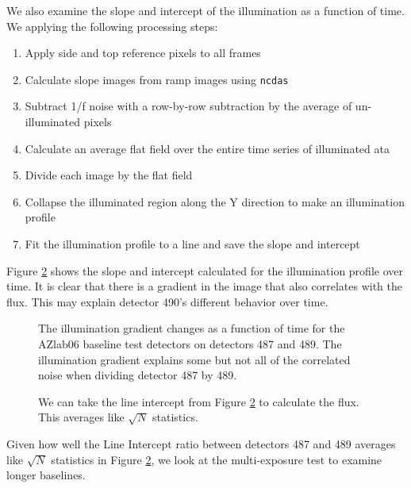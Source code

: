 \documentclass{aastex62}
\begin{document}
We also examine the slope and intercept of the illumination as a function of time.
We applying the following processing steps:
\begin{enumerate}
	\item Apply side and top reference pixels to all frames
	\item	Calculate slope images from ramp images using \texttt{ncdas}
	\item Subtract 1/f noise with a row-by-row subtraction by the average of un-illuminated pixels
	\item Calculate an average flat field over the entire time series of illuminated ata
	\item Divide each image by the flat field
	\item Collapse the illuminated region along the Y direction to make an illumination profile
	\item Fit the illumination profile to a line and save the slope and intercept
\end{enumerate}
Figure \ref{fig:illumGradientChangeOverTime} shows the slope and intercept calculated for the illumination profile over time.
It is clear that there is a gradient in the image that also correlates with the flux.
This may explain detector 490's different behavior over time.

\begin{figure}
\caption{The illumination gradient changes as a function of time for the AZlab06 baseline test detectors on detectors 487 and 489.
The illumination gradient explains some but not all of the correlated noise when dividing detector 487 by 489.}\label{fig:illumGradientChangeOverTime}
\end{figure}

\begin{figure}
\caption{We can take the line intercept from Figure \ref{fig:illumGradientChangeOverTime} to calculate the flux.
This averages like $\sqrt{N}$ statistics.
}\label{fig:illumGradientChangeOverTime}
\end{figure}

Given how well the Line Intercept ratio between detectors 487 and 489 averages like $\sqrt{N}$ statistics in Figure \ref{fig:illumGradientChangeOverTime}, we look at the multi-exposure test to examine longer baselines.
\end{document}
